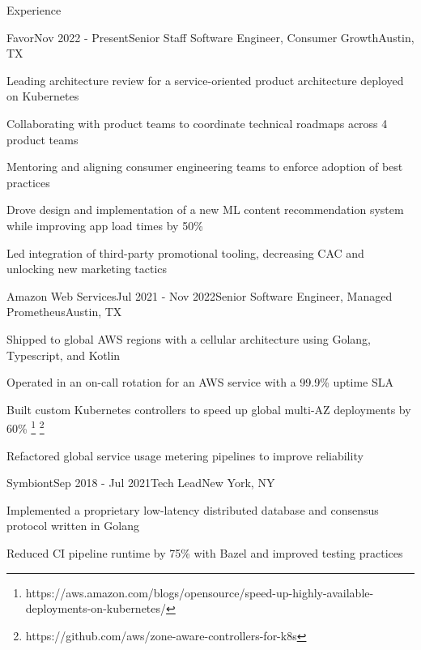 \documentclass[
	10pt, %
]{resume} %
\begin{document}
\begin{rSection}{Experience}

	\begin{rSubsection}{Favor}{Nov 2022 - Present}{Senior Staff Software Engineer, Consumer Growth}{Austin, TX}
        \item Leading architecture review for a service-oriented product architecture deployed on Kubernetes
        \item Collaborating with product teams to coordinate technical roadmaps across 4 product teams
        \item Mentoring and aligning consumer engineering teams to enforce adoption of best practices
        \item Drove design and implementation of a new ML content recommendation system while improving app load times by 50\%
        \item Led integration of third-party promotional tooling, decreasing CAC and unlocking new marketing tactics
	\end{rSubsection}


    \begin{rSubsection}{Amazon Web Services}{Jul 2021 - Nov 2022}{Senior Software Engineer, Managed Prometheus}{Austin, TX}
        \item Shipped to global AWS regions with a cellular architecture using Golang, Typescript, and Kotlin
        \item Operated in an on-call rotation for an AWS service with a 99.9\% uptime SLA
        \item Built custom Kubernetes controllers to speed up global multi-AZ deployments by 60\% \footnote{https://aws.amazon.com/blogs/opensource/speed-up-highly-available-deployments-on-kubernetes/} \footnote{https://github.com/aws/zone-aware-controllers-for-k8s}
        \item Refactored global service usage metering pipelines to improve reliability
    \end{rSubsection}
    

    \begin{rSubsection}{Symbiont}{Sep 2018 - Jul 2021}{Tech Lead}{New York, NY}
        \item Implemented a proprietary low-latency distributed database and consensus protocol written in Golang
        \item Reduced CI pipeline runtime by 75\% with Bazel and improved testing practices
    \end{rSubsection}


\end{rSection}
\end{document}
